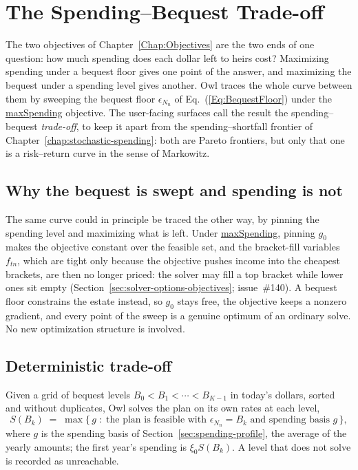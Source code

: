 \documentclass[fleqn,12pt]{report}
\newcommand{\code}[1]{\url{#1}}
\begin{document}
\chapter{The Spending--Bequest Trade-off}
\label{Chap:SpendingBequest}

The two objectives of Chapter~\ref{Chap:Objectives} are the two ends of one question: how much
spending does each dollar left to heirs cost?
Maximizing spending under a bequest floor gives one point of the answer, and maximizing the
bequest under a spending level gives another.
Owl traces the whole curve between them by sweeping the bequest floor $\epsilon_{N_n}$ of
Eq.~(\ref{Eq:BequestFloor}) under the \code{maxSpending} objective.
The user-facing surfaces call the result the spending--bequest \emph{trade-off}, to keep it apart
from the spending--shortfall frontier of Chapter~\ref{chap:stochastic-spending}: both are Pareto
frontiers, but only that one is a risk--return curve in the sense of Markowitz.

\section{Why the bequest is swept and spending is not}
\label{sec:frontier-why-bequest}

The same curve could in principle be traced the other way, by pinning the spending level and
maximizing what is left.
Under \code{maxSpending}, pinning $g_0$ makes the objective constant over the feasible set,
and the bracket-fill variables $f_{tn}$, which are tight only because the objective pushes
income into the cheapest brackets, are then no longer priced: the solver may fill a top bracket
while lower ones sit empty (Section~\ref{sec:solver-options-objectives}; issue~\#140).
A bequest floor constrains the estate instead, so $g_0$ stays free, the objective keeps a nonzero
gradient, and every point of the sweep is a genuine optimum of an ordinary solve.
No new optimization structure is involved.

\section{Deterministic trade-off}
\label{sec:frontier-deterministic}

Given a grid of bequest levels $B_0 < B_1 < \cdots < B_{K-1}$ in today's dollars, sorted and
without duplicates, Owl solves the plan on its own rates at each level,
\begin{equation}
	\label{Eq:FrontierLevel}
	S(B_k) \;=\; \max\bigl\{\, g \;:\; \text{the plan is feasible with } \epsilon_{N_n} = B_k
	\text{ and spending basis } g \,\bigr\},
\end{equation}
where $g$ is the spending basis of Section~\ref{sec:spending-profile}, the average of the
yearly amounts; the first year's spending is $\xi_0 S(B_k)$.
A level that does not solve is recorded as unreachable.
\end{document}
